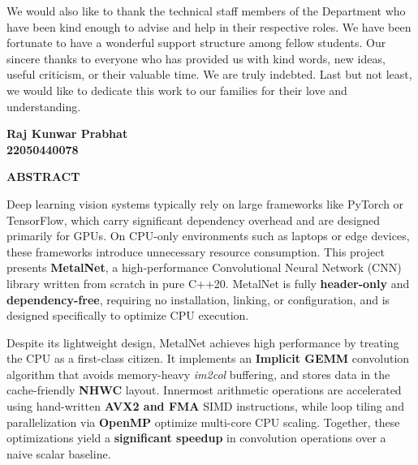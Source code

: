 \documentclass[12pt,oneside,a4paper]{report}
\newcommand{\prelimheading}[1]{%
  \begin{center}
    {\Large\bfseries\color{mnPrimary} #1}
  \end{center}
  \vspace{1cm}%
}
\begin{document}
We would also like to thank the technical staff members of the Department who have been kind
enough to advise and help in their respective roles. We have been fortunate to have a wonderful
support structure among fellow students. Our sincere thanks to everyone who has provided us
with kind words, new ideas, useful criticism, or their valuable time. We are truly indebted. Last but
not least, we would like to dedicate this work to our families for their love and understanding.

\vspace{3cm}

\begin{flushright}
\textbf{Raj Kunwar Prabhat\\
22050440078}
\end{flushright}

\newpage

\vspace*{0.5cm}
\prelimheading{ABSTRACT}

Deep learning vision systems typically rely on large frameworks like PyTorch or TensorFlow, which carry significant dependency overhead and are designed primarily for GPUs. On CPU-only environments such as laptops or edge devices, these frameworks introduce unnecessary resource consumption. This project presents \textbf{MetalNet}, a high-performance Convolutional Neural Network (CNN) library written from scratch in pure C++20. MetalNet is fully \textbf{header-only} and \textbf{dependency-free}, requiring no installation, linking, or configuration, and is designed specifically to optimize CPU execution.

Despite its lightweight design, MetalNet achieves high performance by treating the CPU as a first-class citizen. It implements an \textbf{Implicit GEMM} convolution algorithm that avoids memory-heavy \textit{im2col} buffering, and stores data in the cache-friendly \textbf{NHWC} layout. Innermost arithmetic operations are accelerated using hand-written \textbf{AVX2 and FMA} SIMD instructions, while loop tiling and parallelization via \textbf{OpenMP} optimize multi-core CPU scaling. Together, these optimizations yield a \textbf{significant speedup} in convolution operations over a naive scalar baseline.
\end{document}
